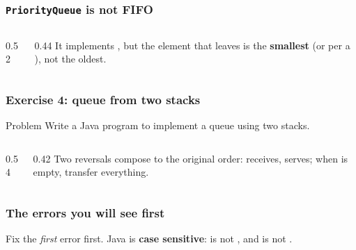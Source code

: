 \documentclass[aspectratio=169,10pt,compress]{beamer}
\begin{document}
\begin{frame}[t,fragile] \frametitle{\texttt{PriorityQueue} is not FIFO}
  \begin{columns}[T]
    \begin{column}{0.52\textwidth}
    \end{column}
    \begin{column}{0.44\textwidth}
      \small
      It implements , but the element that leaves is the
      \textbf{smallest} (or per a ), not the oldest.
    \end{column}
  \end{columns}
\end{frame}




\begin{frame}[t,fragile] \frametitle{Exercise 4: queue from two stacks}
  \begin{block}{Problem}
    Write a Java program to implement a queue using two stacks.
  \end{block}
  \begin{columns}[T]
    \begin{column}{0.54\textwidth}
    \end{column}
    \begin{column}{0.42\textwidth}
      \small
      Two reversals compose to the original order:
       receives,  serves; when  is
      empty, transfer everything.
    \end{column}
  \end{columns}
\end{frame}





\begin{frame}[t,fragile] \frametitle{The errors you will see first}
  \vspace{0.2em}
  \small
  Fix the \emph{first} error first. Java is \textbf{case sensitive}:
   is not , and 
  is not .
\end{frame}
\end{document}
